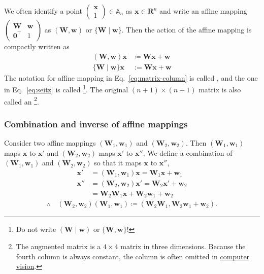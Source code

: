 We often identify a point $ \begin{pmatrix} \bm{x} \\ 1 \end{pmatrix} \in \mathbb{A}_{n}$ as $\bm{x} \in \mathbf{R}^{n}$ and write an affine mapping $\begin{pmatrix} \bm{W} & \bm{w} \\ \bm{0}^{\top} & 1 \end{pmatrix}$ as $( \bm{W}, \bm{w})$ or $\{ \bm{W} \mid \bm{w} \}$.
Then the action of the affine mapping is compactly written as
\begin{align}
  \label{eq:matrix-column}
  (\bm{W}, \bm{w}) \bm{x} &\coloneqq \bm{Wx} + \bm{w} \\
  \label{eq:seitz}
  \{ \bm{W} \mid \bm{w} \} \bm{x} &:= \bm{Wx} + \bm{w}
\end{align}
The notation for affine mapping in Eq.~\eqref{eq:matrix-column} is called , and the one in Eq.~\eqref{eq:seitz} is called  \footnote{
    Do not write $( \bm{W} \mid \bm{w})$ or $\{ \bm{W}, \bm{w} \}$!
}.
The original $(n  + 1) \times (n + 1)$ matrix is also called an  \footnote{
    The augmented matrix is a $4 \times 4$ matrix in three dimensions.
    Because the fourth column is always constant, the column is often omitted in \href{http://opencv.jp/opencv-2.1_org/py/camera_calibration_and_3d_reconstruction.html}{computer vision}.
}.

\subsubsection{Combination and inverse of affine mappings}

Consider two affine mappings $(\bm{W}_{1}, \bm{w}_{1})$ and $(\bm{W}_{2}, \bm{w}_{2})$.
Then $(\bm{W}_{1}, \bm{w}_{1})$ maps $\bm{x}$ to $\bm{x}'$ and $(\bm{W}_{2}, \bm{w}_{2})$ maps $\bm{x}'$ to $\bm{x}''$.
We define a combination of $(\bm{W}_{1}, \bm{w}_{1})$ and $(\bm{W}_{2}, \bm{w}_{2})$ so that it maps $\bm{x}$ to $\bm{x}''$,
\begin{align*}
    \bm{x}' &= (\bm{W}_{1}, \bm{w}_{1}) \bm{x} = \bm{W}_{1} \bm{x} + \bm{w}_{1} \\
    \bm{x}''
        &= (\bm{W}_{2}, \bm{w}_{2}) \bm{x}' = \bm{W}_{2} \bm{x}' + \bm{w}_{2} \\
        &= \bm{W}_{2} \bm{W}_{1} \bm{x} + \bm{W}_{2} \bm{w}_{1} + \bm{w}_{2}
\end{align*}
\begin{align}
    \therefore \quad
        (\bm{W}_{2}, \bm{w}_{2}) (\bm{W}_{1}, \bm{w}_{1}) \coloneqq (\bm{W}_{2} \bm{W}_{1}, \bm{W}_{2} \bm{w}_{1} + \bm{w}_{2}).
\end{align}

